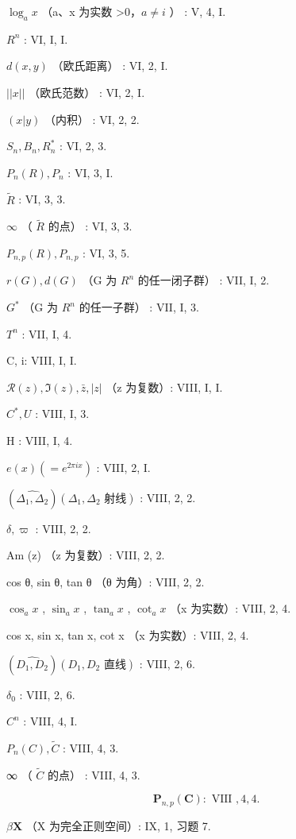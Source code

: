 \(\log_{a}x\) （a、x 为实数 \textgreater0，\(a \neq i\) ） : V, 4, I.

\(R^{n}\) : VI, I, I.

\(d(x, y)\) （欧氏距离） : VI, 2, I.

\(||x||\) （欧氏范数） : VI, 2, I.

\((x|y)\) （内积） : VI, 2, 2.

\(S_{n}, B_{n}, R_{n}^{*}\) : VI, 2, 3.

\(P_{n}(R), P_{n}\) : VI, 3, I.

\(\tilde{R}\) : VI, 3, 3.

\(\infty\) （ \(\tilde{R}\) 的点） : VI, 3, 3.

\(P_{n,p}(R), P_{n,p}\) : VI, 3, 5.

\(r(G), d(G)\) （G 为 \(R^{n}\) 的任一闭子群） : VII, I, 2.

\(G^{*}\) （G 为 \(R^{n}\) 的任一子群） : VII, I, 3.

\(T^{n}\) : VII, I, 4.

C, i: VIII, I, I.

\(\mathcal{R}(z), \Im(z), \bar{z}, |z|\) （z 为复数）: VIII, I, I.

\(C^{*}, U\) : VIII, I, 3.

H : VIII, I, 4.

\(e(x) (= e^{2\pi ix})\) : VIII, 2, I.

\((\widehat{\Delta_{1}, \Delta_{2}})(\Delta_{1}, \Delta_{2}\text{ 射线})\) : VIII, 2, 2.

\(\delta, \varpi\) : VIII, 2, 2.

Am (z) （z 为复数）: VIII, 2, 2.

cos θ, sin θ, tan θ （θ 为角）: VIII, 2, 2.

\(\cos_{a}x\) , \(\sin_{a}x\) , \(\tan_{a}x\) , \(\cot_{a}x\) （x 为实数）: VIII, 2, 4.

cos x, sin x, tan x, cot x （x 为实数）: VIII, 2, 4.

\((\widehat{D_{1}, D_{2}})(D_{1}, D_{2}\text{ 直线})\) : VIII, 2, 6.

\(\delta_{0}\) : VIII, 2, 6.

\(C^{n}\) : VIII, 4, I.

\(P_{n}(C), \tilde{C}\) : VIII, 4, 3.

∞ （ \(\tilde{C}\) 的点） : VIII, 4, 3.

\[
\mathbf {P} _ {n, p} (\mathbf {C}): \text { VIII }, 4, 4.
\]

\(\beta \mathbf{X}\) （X 为完全正则空间）: IX, 1, 习题 7.


